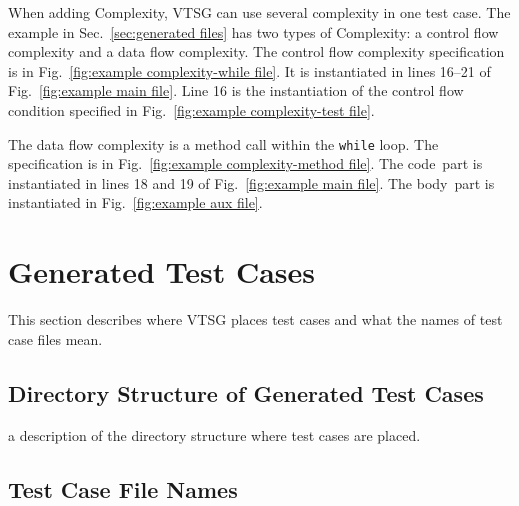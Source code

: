 \documentclass[12pt]{article}
\begin{document}
When adding Complexity, VTSG can use several complexity in one
test case.
The example in Sec.~\ref{sec:generated files} has two types of
Complexity: a control flow complexity and a data flow complexity. 
The control flow complexity specification is in 
Fig.~\ref{fig:example complexity-while file}.  It is instantiated in 
lines 16--21 of
Fig.~\ref{fig:example main file}.  Line 16 is the instantiation of 
the control flow condition
specified in Fig.~\ref{fig:example complexity-test file}.

The data flow complexity is a method call within the \verb|while| loop.  
The specification
is in Fig.~\ref{fig:example complexity-method file}.  
The \texlangle code\texrangle\ 
part is instantiated in lines 18 and 19 of 
Fig.~\ref{fig:example main file}. 
The \texlangle body\texrangle\ part is instantiated in 
Fig.~\ref{fig:example aux file}.


\section{Generated Test Cases}

This section describes where VTSG places test cases and what the
names of test case files mean.

\subsection{Directory Structure of Generated Test Cases}
\label{sec: test suite directory structure}

 a description of the directory structure where test cases are placed.

\subsection{Test Case File Names}
\label{sec:case file name}
\end{document}
